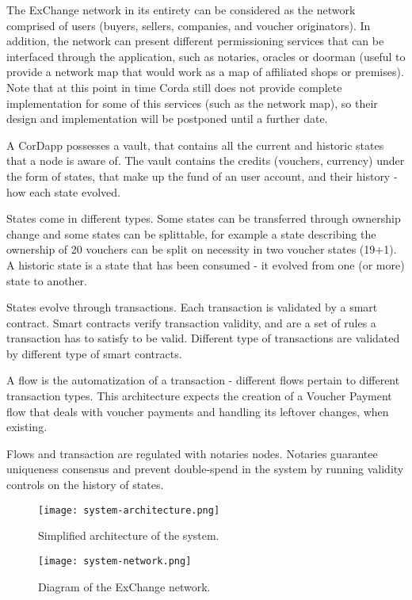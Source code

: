 The ExChange network in its entirety can be considered as the network comprised of users (buyers, sellers, companies, and voucher originators). In addition, the network can present different permissioning services that can be interfaced through the application, such as notaries, oracles or doorman (useful to provide a network map that would work as a map of affiliated shops or premises).
Note that at this point in time Corda still does not provide complete implementation for some of this services (such as the network map), so their design and implementation will be postponed until a further date.

A CorDapp possesses a vault, that contains all the current and historic states that a node is aware of. The vault contains the credits (vouchers, currency) under the form of states, that make up the fund of an user account, and their history - how each state evolved. 

States come in different types. Some states can be transferred through ownership change and some states can be splittable, for example a state describing the ownership of 20 vouchers can be split on necessity in two voucher states (19+1).
A historic state is a state that has been consumed - it evolved from one (or more) state to another.

States evolve through transactions. Each transaction is validated by a smart contract. Smart contracts verify transaction validity, and are a set of rules a transaction has to satisfy to be valid. Different type of transactions are validated by different type of smart contracts.

A flow is the automatization of a transaction - different flows pertain to different transaction types. This architecture expects the creation of a Voucher Payment flow that deals with voucher payments and handling its leftover changes, when existing.

Flows and transaction are regulated with notaries nodes. Notaries guarantee uniqueness consensus and prevent double-spend in the system by running validity controls on the history of states.

\begin{figure}[h!]
    \centering
    \texttt{[image: system-architecture.png]}
    \caption{
       Simplified architecture of the system.
        }
\end{figure}

\begin{figure}[h!]
    \centering
    \texttt{[image: system-network.png]}
    \caption{
       Diagram of the ExChange network.
        }
\end{figure}

